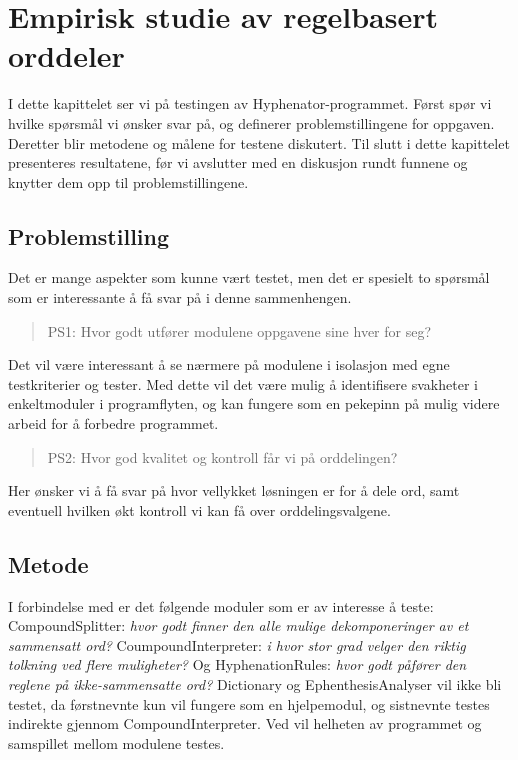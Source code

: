 \chapter{Empirisk studie av regelbasert orddeler}

I dette kapittelet ser vi på testingen av Hyphenator-programmet. Først spør vi hvilke spørsmål vi ønsker svar på, og definerer problemstillingene for oppgaven. Deretter blir metodene og målene for testene diskutert. Til slutt i dette kapittelet presenteres resultatene, før vi avslutter med en diskusjon rundt funnene og knytter dem opp til problemstillingene. 

\section{Problemstilling}

Det er mange aspekter som kunne vært testet, men det er spesielt to spørsmål som er interessante å få svar på i denne sammenhengen.

\begin{quote}
PS1: Hvor godt utfører modulene oppgavene sine hver for seg?
\end{quote}

Det vil være interessant å se nærmere på modulene i isolasjon med egne testkriterier og tester. Med dette vil det være mulig å identifisere svakheter i enkeltmoduler i programflyten, og kan fungere som en pekepinn på mulig videre arbeid for å forbedre programmet.

\begin{quote}
PS2: Hvor god kvalitet og kontroll får vi på orddelingen?
\end{quote}

Her ønsker vi å få svar på hvor vellykket løsningen er for å dele ord, samt eventuell hvilken økt kontroll vi kan få over orddelingsvalgene.

\section{Metode}

I forbindelse med  er det følgende moduler som er av interesse å teste: CompoundSplitter: \textit{hvor godt finner den alle mulige dekomponeringer av et sammensatt ord?} CoumpoundInterpreter: \textit{i hvor stor grad velger den riktig tolkning ved flere muligheter?} Og HyphenationRules: \textit{hvor godt påfører den reglene på ikke-sammensatte ord?} Dictionary og EphenthesisAnalyser vil ikke bli testet, da førstnevnte kun vil fungere som en hjelpemodul, og sistnevnte testes indirekte gjennom CompoundInterpreter. Ved  vil helheten av programmet og samspillet mellom modulene testes.

